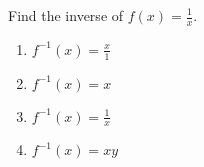 \bigskip

\item Find the inverse of $\displaystyle f(x)=\frac{1}{x}$.

    \begin{enumerate}
    \item $\displaystyle f^{-1}(x)=\frac{x}{1}$
    \item $f^{-1}(x)=x$
    \item $\displaystyle f^{-1}(x)=\frac{1}{x}$
    \item $f^{-1}(x)=xy$
    \end{enumerate}


